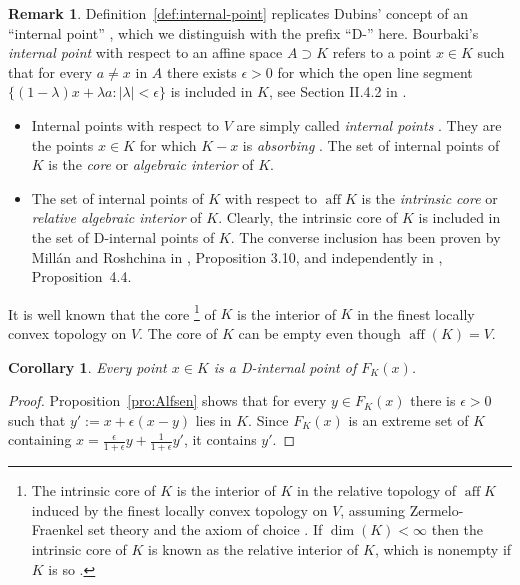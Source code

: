\documentclass[a4paper,11pt,reqno]{amsart}
\numberwithin{equation}{section}
\theoremstyle{plain}
\newtheorem{corollary}[theorem]{Corollary}
\theoremstyle{definition}
\newtheorem{remark}[theorem]{Remark}
\DeclareMathOperator\aff{aff} %
\begin{document}
\begin{remark}\label{remark:internal-points}
Definition~\ref{def:internal-point} replicates Dubins' concept of an ``internal 
point'' \cite{dubins62}, which we distinguish with the prefix ``D-'' here. 
Bourbaki's \emph{internal point} with respect to an affine space $A\supset K$
refers to a point $x\in K$ such that for every $a\neq x$ in $A$ there exists  
$\epsilon>0$ for which the open line segment 
$\{(1-\lambda)x+\lambda a: |\lambda|<\epsilon\}$ is included in $K$, see 
Section II.4.2 in \cite{bourbaki87}. 
\begin{itemize}
\item    
Internal points with respect to $V$ are simply called \emph{internal points} 
\cite{aliprantis-border06,bourbaki87,dunford-schwartz88,royden-fitzpatrick10}. 
They are the points $x\in K$ for which $K-x$ is \emph{absorbing} 
\cite{aliprantis-border06,bourbaki87,rudin91}. The set of internal points of 
$K$ is the \emph{core} or \emph{algebraic interior} 
\cite{barvinok02,holmes75,khazayel-etal21,zalinescu99} of $K$. 
%
\item 
The set of internal points of $K$ with respect to $\aff K$ is the 
\emph{intrinsic core} \cite{holmes75,khazayel-etal21,zalinescu99}
or \emph{relative algebraic interior} 
\cite{khazayel-etal21,weis-shirokov21,weis25,zalinescu99} of $K$. Clearly, the
intrinsic core of $K$ is included in the set of D-internal points  of $K$. The 
converse inclusion has been proven by Mill{\'a}n and Roshchina in 
\cite{millan-roshchina23}, Proposition 3.10, and independently in \cite{weis25}, 
Proposition~4.4. 
\end{itemize}
%
It is well known that the core%
%
\footnote{The intrinsic core of $K$ is the interior of $K$ in the relative topology of 
$\aff K$ induced by the finest locally convex topology on $V$\!, assuming Zermelo-Fraenkel 
set theory and the axiom of choice \cite[Section~3]{weis25}. If $\dim(K)<\infty$ then 
the intrinsic core of $K$ is known as the relative interior of $K$, which is nonempty if 
$K$ is so \cite[Section~6]{rockafellar70}.}
%
of $K$ is the interior of $K$ in the finest locally convex topology \cite[II.26]{bourbaki87} 
on $V$. The core of $K$ can be empty \cite{barvinok02,holmes75} even though $\aff(K)=V$.
\end{remark}
%
\begin{corollary}\label{cor:internal}
Every point $x\in K$ is a D-internal point of $F_K(x)$.
\end{corollary}
%
\begin{proof}
Proposition~\ref{pro:Alfsen} shows that for every $y\in F_K(x)$ there is $\epsilon>0$ such 
that $y':=x+\epsilon(x-y)$ lies in $K$. Since $F_K(x)$ is an extreme set of $K$ containing 
$x=\frac{\epsilon}{1+\epsilon}y+\frac{1}{1+\epsilon}y'$, it contains $y'$.
\end{proof}
\end{document}
